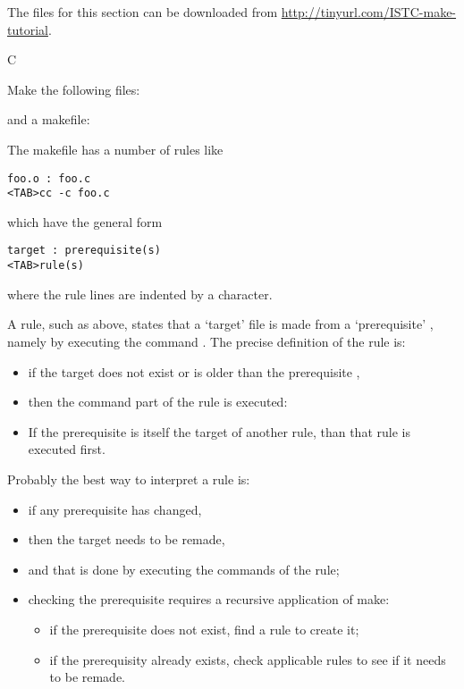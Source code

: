 The files for this section can be downloaded from
\url{http://tinyurl.com/ISTC-make-tutorial}.

 {C}

Make the following files:

and a makefile:

The makefile has a number of rules like
\begin{verbatim}
foo.o : foo.c
<TAB>cc -c foo.c
\end{verbatim}
which have the general form
\begin{verbatim}
target : prerequisite(s)
<TAB>rule(s)
\end{verbatim}
where the rule lines are indented by a  character.

A rule, such as above, states that a `target' file  is made
from a `prerequisite' , namely by executing the command . The precise definition of the rule is:
\begin{itemize}
\item if the target  does not exist or is older than the
  prerequisite ,
\item then the command part of the rule is executed: 
\item If the prerequisite is itself the target of another rule, than that
  rule is executed first.
\end{itemize}
Probably the best way to interpret a rule is:
\begin{itemize}
\item if any prerequisite has changed,
\item then the target needs to be remade,
\item and that is done by executing the commands of the rule;
\item checking the prerequisite requires a recursive application of
  make:
  \begin{itemize}
  \item if the prerequisite does not exist, find a rule to create it;
  \item if the prerequisity already exists, check applicable rules to
    see if it needs to be remade.
  \end{itemize}
\end{itemize}

